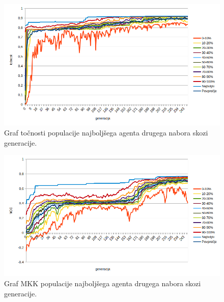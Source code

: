 \begin{figure}[H]
    \begin{center}
        \includegraphics[width=13cm]{shuttle/2/acc}
    \end{center}
    \caption{Graf točnosti populacije najboljšega agenta drugega nabora skozi generacije.}
    \label{fig:statlog_acc_2}
\end{figure}

\begin{figure}[H]
    \begin{center}
        \includegraphics[width=13cm]{shuttle/2/mcc}
    \end{center}
    \caption{Graf MKK populacije najboljšega agenta drugega nabora skozi generacije.}
    \label{fig:statlog_mcc_2}
\end{figure}

